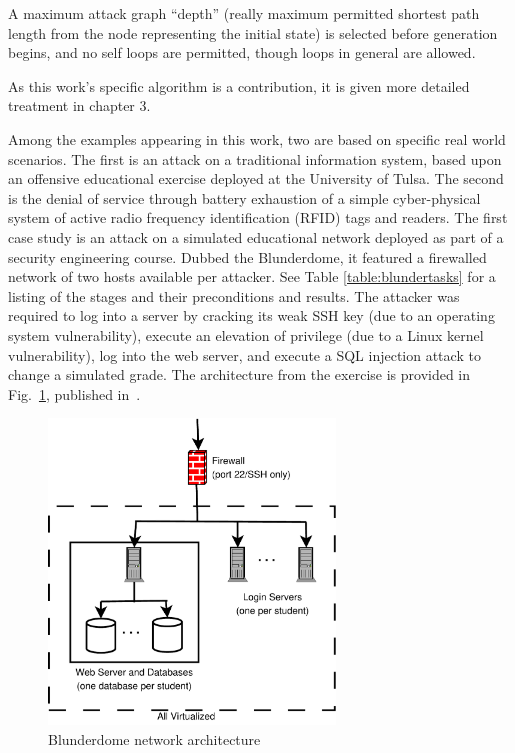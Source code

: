 A maximum attack graph ``depth'' (really 
maximum permitted shortest path length from the
node representing the initial state) is selected before generation begins, and
no self loops are permitted, though loops in general are allowed.

As this work's specific algorithm is a contribution, it is given
more detailed treatment in chapter 3.

Among the examples appearing in this work, two are based on specific real world
scenarios.
The first is an attack on a traditional information system, based upon an offensive educational exercise
deployed at the University of Tulsa. The second is the 
denial of service through battery exhaustion of a simple
cyber-physical system of active radio frequency identification (RFID) tags and readers.
\label{sec:blunderdome}
The first case study is an attack on a simulated educational network deployed as part of a
security engineering course. Dubbed the Blunderdome, it featured a firewalled network of
two hosts available per attacker. See Table \ref{table:blundertasks} for a listing of the stages and
their preconditions and results. The attacker was required to log into a server by cracking
its weak SSH key (due to an operating system vulnerability), execute an elevation of privilege (due
to a Linux kernel vulnerability), log into the web server, and execute a SQL injection attack to
change a simulated grade. The architecture from the exercise is provided in 
Fig.~\ref{fig:blunderarch}, published in~\cite{louthan2010blunderdome}.

\begin{figure}
\centering
\includegraphics[width=3in]{blunderarch}
\caption{Blunderdome network architecture}
\label{fig:blunderarch}
\end{figure}

